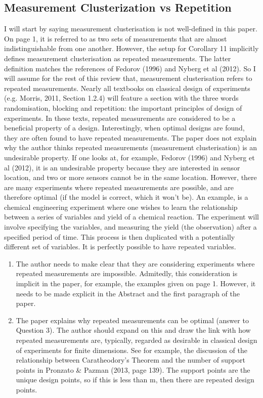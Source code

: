 \documentclass{amsart}
\begin{document}
\subsection{Measurement Clusterization vs Repetition}
I will start by saying measurement clusterisation is not well-defined
in this paper. On page 1, it is referred to as two sets of
measurements that are almost indistinguishable from one
another. However, the setup for Corollary 11 implicitly defines
measurement clusterisation as repeated measurements. The latter
definition matches the references of Fedorov (1996) and Nyberg et al
(2012). So I will assume for the rest of this review that, measurement
clusterisation refers to repeated measurements.  Nearly all textbooks
on classical design of experiments (e.g. Morris, 2011, Section 1.2.4)
will feature a section with the three words randomisation, blocking
and repetition: the important principles of design of experiments.  In
these texts, repeated measurements are considered to be a beneficial
property of a design. Interestingly, when optimal designs are found,
they are often found to have repeated measurements.  The paper does
not explain why the author thinks repeated measurements (measurement
clusterisation) is an undesirable property. If one looks at, for
example, Fedorov (1996) and Nyberg et al (2012), it is an undesirable
property because they are interested in sensor location, and two or
more sensors cannot be in the same location. However, there are many
experiments where repeated measurements are possible, and are
therefore optimal (if the model is correct, which it won’t be). An
example, is a chemical engineering experiment where one wishes to
learn the relationship between a series of variables and yield of a
chemical reaction. The experiment will involve specifying the
variables, and measuring the yield (the observation) after a specified
period of time. This process is then duplicated with a potentially
different set of variables.  It is perfectly possible to have repeated
variables.
\begin{enumerate}
\item The author needs to make clear that they are considering
  experiments where repeated measurements are impossible. Admitedly,
  this consideration is implicit in the paper, for example, the
  examples given on page 1. However, it needs to be made explicit in
  the Abstract and the first paragraph of the paper.

\item The paper explains why repeated measurements can be optimal
  (answer to Question 3). The author should expand on this and draw
  the link with how repeated measurements are, typically, regarded as
  desirable in classical design of experiments for finite
  dimensions. See for example, the discussion of the relationship
  between Caratheodory’s Theorem and the number of support points in
  Pronzato \& Pazman (2013, page 139). The support points are the
  unique design points, so if this is less than m, then there are
  repeated design points.
\end{enumerate}
\end{document}
